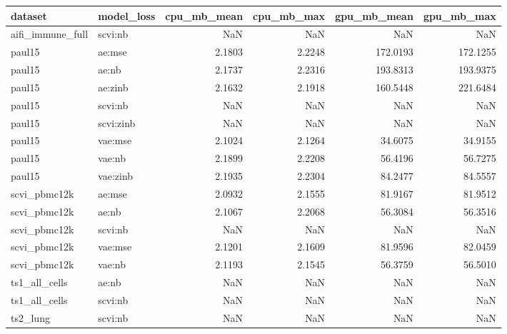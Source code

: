 \begin{tabular}{llrrrr}
\toprule
dataset & model\_loss & cpu\_mb\_mean & cpu\_mb\_max & gpu\_mb\_mean & gpu\_mb\_max \\
\midrule
aifi\_immune\_full & scvi:nb & NaN & NaN & NaN & NaN \\
paul15 & ae:mse & 2.1803 & 2.2248 & 172.0193 & 172.1255 \\
paul15 & ae:nb & 2.1737 & 2.2316 & 193.8313 & 193.9375 \\
paul15 & ae:zinb & 2.1632 & 2.1918 & 160.5448 & 221.6484 \\
paul15 & scvi:nb & NaN & NaN & NaN & NaN \\
paul15 & scvi:zinb & NaN & NaN & NaN & NaN \\
paul15 & vae:mse & 2.1024 & 2.1264 & 34.6075 & 34.9155 \\
paul15 & vae:nb & 2.1899 & 2.2208 & 56.4196 & 56.7275 \\
paul15 & vae:zinb & 2.1935 & 2.2304 & 84.2477 & 84.5557 \\
scvi\_pbmc12k & ae:mse & 2.0932 & 2.1555 & 81.9167 & 81.9512 \\
scvi\_pbmc12k & ae:nb & 2.1067 & 2.2068 & 56.3084 & 56.3516 \\
scvi\_pbmc12k & scvi:nb & NaN & NaN & NaN & NaN \\
scvi\_pbmc12k & vae:mse & 2.1201 & 2.1609 & 81.9596 & 82.0459 \\
scvi\_pbmc12k & vae:nb & 2.1193 & 2.1545 & 56.3759 & 56.5010 \\
ts1\_all\_cells & ae:nb & NaN & NaN & NaN & NaN \\
ts1\_all\_cells & scvi:nb & NaN & NaN & NaN & NaN \\
ts2\_lung & scvi:nb & NaN & NaN & NaN & NaN \\
\bottomrule
\end{tabular}

